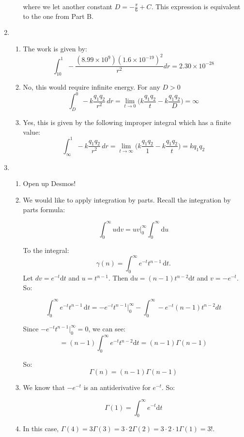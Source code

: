 \begin{enumerate}
\begin{enumerate}
    where we let another constant $D = - \frac{\pi}{6} + C$. This expression is equivalent to the one from Part B.
\end{enumerate}
\item 
\begin{enumerate}
    \item The work is given by:
    \[
    \displaystyle\int_{10}^1 -\frac{\left(8.99\times10^9\right)\left(1.6\times10^{-19}\right)^2}{r^2}dr = 2.30\times10^{-28}
    \]
    \item 
    No, this would require infinite energy. For any $D>0$
    $$\int_D^0 -k\frac{q_1 q_2}{r^2} \, dr = \underset{t\rightarrow 0}{\lim} \Big( k\frac{q_1 q_2}{t} -  k\frac{q_1 q_2}{D}\Big) = \infty$$
    \item Yes, this is given by the following improper integral which has a finite value:
    $$\int_\infty^1 -k\frac{q_1 q_2}{r^2} \, dr = \underset{t\rightarrow \infty}{\lim} \Big( k\frac{q_1 q_2}{1} -  k\frac{q_1 q_2}{t}\Big) = kq_1q_2$$
\end{enumerate}
\item 
\begin{enumerate}
    \item Open up Desmos!
    \item We would like to apply integration by parts. Recall the integration by parts formula:

    \[
    \int_0^\infty u\mathrm dv = uv|_0^\infty \int_0^\infty \mathrm du
    \]

    To the integral:
    \[
        \gamma(n) = \int_0^\infty e^{-t}t^{n-1}\,\mathrm dt.
    \]    
    Let $dv = e^{-t}\mathrm dt$ and $u = t^{n-1}$. Then $\mathrm d u = (n-1)t^{n-2} \mathrm d t$ and $v = -e^{-t}$. So:

    
    \[
        \int_0^\infty e^{-t}t^{n-1}\,\mathrm dt = -e^{-t}t^{n-1}|_0^\infty -\int_0^\infty -e^{-t}(n-1)t^{n-2}dt
    \]
    
    Since $-e^{-t}t^{n-1}|_0^\infty = 0$, we can see:
    \[
        =(n-1)\int_0^\infty e^{-t}t^{n-2}\mathrm dt =(n-1) \Gamma(n-1) 
    \]

    So:
    \[
        \Gamma(n) = (n-1)\Gamma(n-1) 
    \]

    \item We know that $-e^{-t}$ is an antiderivative for $e^{-t}$. So:

    \[
        \Gamma(1) = \int_0^\infty e^{-t} \mathrm dt
    \]


    
    \item In this case, $ \Gamma(4) = 3\Gamma(3) = 3\cdot 2 \Gamma(2) = 3\cdot 2 \cdot 1 \Gamma(1) = 3!$. 


\end{enumerate}
\end{enumerate}
